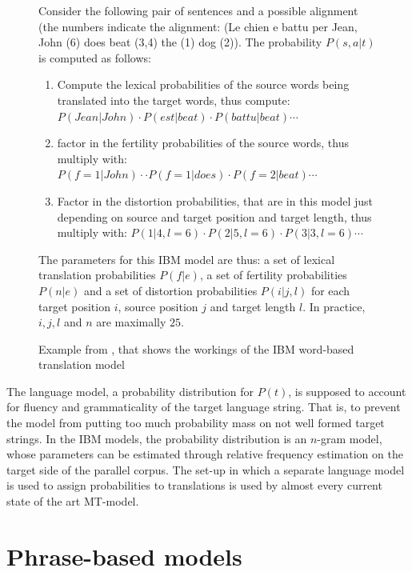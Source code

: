 \documentclass{report}
\theoremstyle{definition}
\theoremstyle{plain}
\begin{document}
\begin{figure}[!ht]
\begin{framed}
\scriptsize{
Consider the following pair of sentences and a possible alignment (the numbers indicate the alignment: (Le chien e battu per Jean, John (6) does beat (3,4) the (1) dog (2)). The probability $P(s,a|t)$ is computed as follows:\begin{enumerate}
\item Compute the lexical probabilities of the source words being translated into the target words, thus compute: $P(Jean|John)\cdot P(est|beat)\cdot P(battu|beat)\cdots$
\item factor in the fertility probabilities of the source words, thus multiply with:  $P(f\!=\!1|John)\cdot \cdot P(f\!=\!1|does) \cdot P(f\!=\!2|beat)\cdots $
\item Factor in the distortion probabilities, that are in this model just depending on source and target position and target length, thus multiply with: $P(1|4,l\!=\!6)\cdot P(2|5,l\!=\!6)\cdot P(3|3,l\!=\!6) \cdots $
\end{enumerate}
The parameters for this IBM model are thus: a set of lexical translation probabilities $P(f|e)$, a set of fertility probabilities $P(n|e)$ and a set of distortion probabilities $P(i|j,l)$ for each target position $i$, source position $j$ and target length $l$. In practice, $i,j,l$ and $n$ are maximally $25$.
}
\end{framed}
\caption{Example from \cite[p.3]{brown1990statistical}, that shows the workings of the IBM word-based translation model}\label{fig:IBM-model}
\end{figure}

The language model, a probability distribution for $P(t)$, is supposed to account for fluency and grammaticality of the target language string. That is, to prevent the model from putting too much probability mass on not well formed target strings. In the IBM models, the probability distribution is an $n$-gram model, whose parameters can be estimated through relative frequency estimation on the target side of the parallel corpus. The set-up in which a separate language model is used to assign probabilities to translations is used by almost every current state of the art MT-model.


\section{Phrase-based models}
\label{sec:pbmodels}
\end{document}
